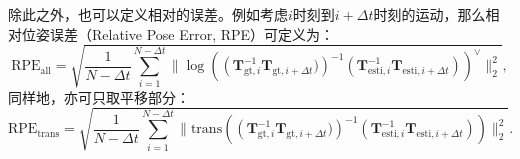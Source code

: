 除此之外，也可以定义相对的误差。例如考虑$i$时刻到$i+\Delta t$时刻的运动，那么相对位姿误差（Relative Pose Error, RPE）可定义为：
\begin{equation}
\mathrm{RPE}_{\mathrm{all}} = \sqrt{ \frac{1}{N-\Delta t} \sum_{i=1}^{N-\Delta t} \| \log \left( \left(\bm{T}_{\mathrm{gt},i}^{-1} \bm{T}_{\mathrm{gt},i+\Delta t} )\right)^{-1} \left(\bm{T}_{\mathrm{esti},i}^{-1} \bm{T}_{\mathrm{esti},i+\Delta t}\right)\right)^{\vee} \|_2^2},
\end{equation}
同样地，亦可只取平移部分：
\begin{equation}
\mathrm{RPE}_{\mathrm{trans}} = \sqrt{ \frac{1}{N-\Delta t} \sum_{i=1}^{N-\Delta t} \| \mathrm{trans} \left( \left(\bm{T}_{\mathrm{gt},i}^{-1} \bm{T}_{\mathrm{gt},i+\Delta t} )\right)^{-1} \left(\bm{T}_{\mathrm{esti},i}^{-1} \bm{T}_{\mathrm{esti},i+\Delta t}\right)\right) \|_2^2}.
\end{equation}

